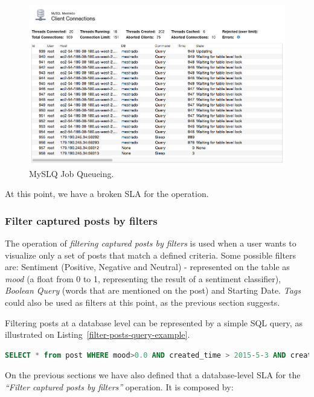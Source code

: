 \begin{figure}[ht!]
\centering
\includegraphics[width=120mm]{Imagens/queryQueueing.png}
\caption{MySLQ Job Queueing.\label{fig:queryQueuing}}
\end{figure}

At this point, we have a broken SLA for the operation.


\subsubsection{Filter captured posts by filters}
\label{filterposts}

The operation of \textit{filtering captured posts by filters} is used when a user wants to visualize only a set of posts that match a defined criteria. Some possible filters are: Sentiment (Positive, Negative and Neutral) - represented on the table as \textit{mood} (a float from 0 to 1, representing the result of a sentiment classifier), \textit{Boolean Query} (words that are mentioned on the post) and Starting Date. \textit{Tags} could also be used as filters at this point, as the previous section suggests. 

Filtering posts at a database level can be represented by a simple SQL query, as illustrated on Listing~\ref{filter-posts-query-example}.

\begin{lstlisting}[language=SQL,firstnumber=1, caption=Filter posts query - Example, label=filter-posts-query-example]
SELECT * from post WHERE mood>0.0 AND created_time > 2015-5-3 AND created_time < 2015-7-15 AND message like '%ruim%'
\end{lstlisting} 


On the previous sections we have also defined that a database-level SLA for the \textit{``Filter captured posts by filters''} operation. It is composed by: 

